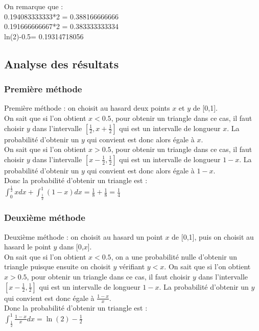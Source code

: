 \documentclass[a4paper,11pt]{book}
\begin{document}
On remarque que :\\
0.194083333333*2 = 0.388166666666\\
 0.191666666667*2 = 0.383333333334\\
ln(2)-0.5= 0.19314718056\\
\subsection{Analyse des r\'esultats}
\subsubsection{Premi\`ere m\'ethode}
 Premi\`ere m\'ethode :  on choisit au hasard deux points $x$ et $y$ de [0,1].\\
On sait que si l'on obtient $x<0.5$, pour obtenir un triangle dans ce cas, 
il faut choisir $y$ dans l'intervalle 
$[\frac{1}{2},x+\frac{1}{2}]$ qui est un intervalle de longueur $x$. La probabilit\'e d'obtenir
un $y$ qui convient est donc alors \'egale \`a $x$.\\
On sait que si l'on obtient $x>0.5$, pour obtenir un triangle dans ce cas, 
il faut choisir $y$ dans l'intervalle 
$[x-\frac{1}{2},\frac{1}{2}]$ qui est un intervalle de longueur $1-x$. La probabilit\'e 
d'obtenir un $y$ qui convient est donc alors \'egale \`a $1-x$.\\
Donc la probabilit\'e d'obtenir un triangle est :\\
$\displaystyle \int_0^{\frac{1}{2}}xdx+\int_{\frac{1}{2}}^1(1-x)dx=\frac{1}{8}+\frac{1}{8}=\frac{1}{4}$
\subsubsection{Deuxi\`eme m\'ethode}
Deuxi\`eme m\'ethode : on choisit au hasard un point $x$ de [0,1], puis 
on choisit au hasard le point $y$ dans [0,$x$].\\
On sait que si l'on obtient $x<0.5$,
 on a une probabilit\'e nulle d'obtenir un triangle puisque ensuite on choisit 
$y$ v\'erifiant $y<x$.
On sait que si l'on obtient $x>0.5$,  pour obtenir un triangle dans ce cas, il
 faut choisir $y$ dans l'intervalle 
$[x-\frac{1}{2},\frac{1}{2}]$ qui est un intervalle de longueur $1-x$. La probabilit\'e 
d'obtenir un $y$ qui convient est donc \'egale \`a $\frac{1-x}{x}$.\\
Donc la probabilit\'e d'obtenir un triangle est :\\
$\displaystyle \int_{\frac{1}{2}}^1\frac{1-x}{x}dx=\ln(2)-\frac{1}{2}$
\end{document}
